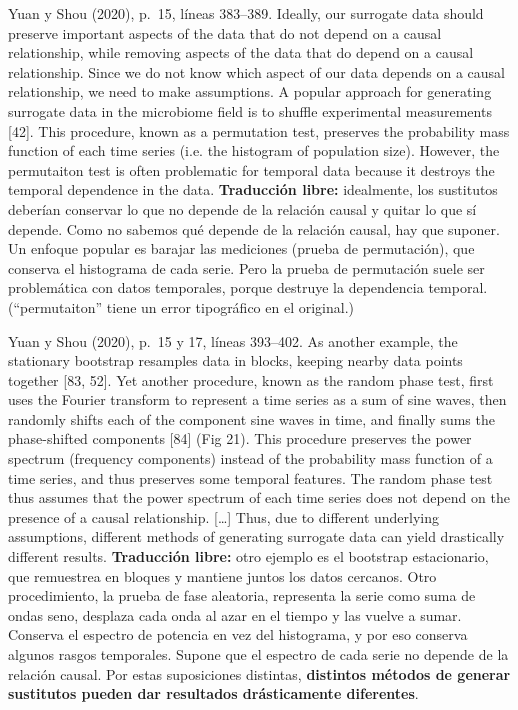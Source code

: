 \documentclass[11pt,openany]{book}
\begin{document}
\begin{cita}{Yuan y Shou (2020), p.~15, líneas 383--389.}
Ideally, our surrogate data should preserve important aspects of the data that do not depend on a causal relationship, while removing aspects of the data that do depend on a causal relationship. Since we do not know which aspect of our data depends on a causal relationship, we need to make assumptions. A popular approach for generating surrogate data in the microbiome field is to shuffle experimental measurements [42]. This procedure, known as a permutation test, preserves the probability mass function of each time series (i.e. the histogram of population size). However, the permutaiton test is often problematic for temporal data because it destroys the temporal dependence in the data.
\tcblower
\textbf{Traducción libre:} idealmente, los sustitutos deberían conservar lo que no depende de la relación causal y quitar lo que sí depende. Como no sabemos qué depende de la relación causal, hay que suponer. Un enfoque popular es barajar las mediciones (prueba de permutación), que conserva el histograma de cada serie. Pero la prueba de permutación suele ser problemática con datos temporales, porque destruye la dependencia temporal. (``permutaiton'' tiene un error tipográfico en el original.)
\end{cita}

\begin{cita}{Yuan y Shou (2020), p.~15 y 17, líneas 393--402.}
As another example, the stationary bootstrap resamples data in blocks, keeping nearby data points together [83, 52]. Yet another procedure, known as the random phase test, first uses the Fourier transform to represent a time series as a sum of sine waves, then randomly shifts each of the component sine waves in time, and finally sums the phase-shifted components [84] (Fig 21). This procedure preserves the power spectrum (frequency components) instead of the probability mass function of a time series, and thus preserves some temporal features. The random phase test thus assumes that the power spectrum of each time series does not depend on the presence of a causal relationship. [\dots] Thus, due to different underlying assumptions, different methods of generating surrogate data can yield drastically different results.
\tcblower
\textbf{Traducción libre:} otro ejemplo es el bootstrap estacionario, que remuestrea en bloques y mantiene juntos los datos cercanos. Otro procedimiento, la prueba de fase aleatoria, representa la serie como suma de ondas seno, desplaza cada onda al azar en el tiempo y las vuelve a sumar. Conserva el espectro de potencia en vez del histograma, y por eso conserva algunos rasgos temporales. Supone que el espectro de cada serie no depende de la relación causal. Por estas suposiciones distintas, \textbf{distintos métodos de generar sustitutos pueden dar resultados drásticamente diferentes}.
\end{cita}
\end{document}
